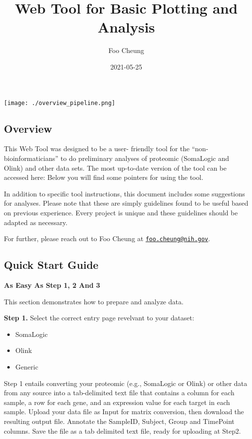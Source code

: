 \documentclass[]{article}
\title{Web Tool for Basic Plotting and Analysis}
\author{Foo Cheung}
\date{2021-05-25}
\providecommand{\tightlist}{%
  \setlength{\itemsep}{0pt}\setlength{\parskip}{0pt}}
\begin{document}
\maketitle

\newpage 
\tableofcontents 
\newpage

\texttt{[image: ./overview\_pipeline.png]}

\hypertarget{overview}{%
\subsection{Overview}\label{overview}}

This Web Tool was designed to be a user- friendly tool for the
``non-bioinformaticians'' to do preliminary analyses of proteomic
(SomaLogic and Olink) and other data sets. The most up-to-date version
of the tool can be accessed here: Below you will find some pointers for
using the tool.

In addition to specific tool instructions, this document includes some
suggestions for analyses. Please note that these are simply guidelines
found to be useful based on previous experience. Every project is unique
and these guidelines should be adapted as necessary.

For further, please reach out to Foo Cheung at
\href{mailto:foo.cheung@nih.gov}{\nolinkurl{foo.cheung@nih.gov}}.

\newpage

\hypertarget{quick-start-guide}{%
\subsection{Quick Start Guide}\label{quick-start-guide}}

\textbf{As Easy As Step 1, 2 And 3}

This section demonstrates how to prepare and analyze data.

\textbf{Step 1.} Select the correct entry page revelvant to your
dataset:

\begin{itemize}
\tightlist
\item
  SomaLogic
\item
  Olink
\item
  Generic
\end{itemize}

Step 1 entails converting your proteomic (e.g., SomaLogic or Olink) or
other data from any source into a tab-delimited text file that contains
a column for each sample, a row for each gene, and an expression value
for each target in each sample. Upload your data file as Input for
matrix conversion, then download the resulting output file. Annotate the
SampleID, Subject, Group and TimePoint columns. Save the file as a tab
delimited text file, ready for uploading at Step2.
\end{document}
